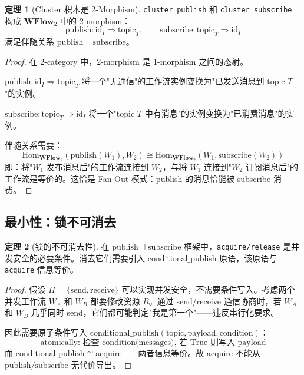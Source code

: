 \documentclass[11pt,a4paper]{article}
\theoremstyle{definition}
\newtheorem{theorem}{定理}[section]
\theoremstyle{definition}
\theoremstyle{remark}
\newcommand{\cat}[1]{\mathbf{#1}}
\newcommand{\catWFlow}{\cat{WFlow}}
\newcommand{\id}{\mathrm{id}}
\newcommand{\homset}[3]{\mathrm{Hom}_{#1}(#2, #3)}
\newcommand{\natarrow}{\Rightarrow}
\newcommand{\adjunction}{\dashv}
\begin{document}
\begin{theorem}[Cluster 积木是 2-Morphism]
\texttt{cluster\_publish} 和 \texttt{cluster\_subscribe} 构成 $\catWFlow_2$ 中的 2-morphism：
\[
\mathrm{publish}: \id_I \natarrow \mathrm{topic}_T, \qquad
\mathrm{subscribe}: \mathrm{topic}_T \natarrow \id_I
\]
满足伴随关系 $\mathrm{publish} \adjunction \mathrm{subscribe}$。
\label{thm:cluster-2morphism}
\end{theorem}

\begin{proof}
在 2-category 中，2-morphism 是 1-morphism 之间的态射。

$\mathrm{publish}: \id_I \natarrow \mathrm{topic}_T$ 将一个"无通信"的工作流实例变换为"已发送消息到 topic $T$"的实例。

$\mathrm{subscribe}: \mathrm{topic}_T \natarrow \id_I$ 将一个"topic $T$ 中有消息"的实例变换为"已消费消息"的实例。

伴随关系需要：
\[
\homset{\catWFlow_2}{\mathrm{publish}(W_1)}{W_2} \cong \homset{\catWFlow_2}{W_1}{\mathrm{subscribe}(W_2)}
\]
即：将"$W_1$ 发布消息后"的工作流连接到 $W_2$，与将 $W_1$ 连接到"$W_2$ 订阅消息后"的工作流是等价的。这恰是 Fan-Out 模式：publish 的消息恰能被 subscribe 消费。
\end{proof}

\subsection{最小性：锁不可消去}

\begin{theorem}[锁的不可消去性]
在 $\mathrm{publish} \adjunction \mathrm{subscribe}$ 框架中，\texttt{acquire/release} 是并发安全的必要条件。消去它们需要引入 $\mathrm{conditional\_publish}$ 原语，该原语与 \texttt{acquire} 信息等价。
\label{thm:lock-irreducible}
\end{theorem}

\begin{proof}
假设 $\Pi = \{\mathrm{send}, \mathrm{receive}\}$ 可以实现并发安全，不需要条件写入。考虑两个并发工作流 $W_A$ 和 $W_B$ 都要修改资源 $R$。通过 send/receive 通信协商时，若 $W_A$ 和 $W_B$ 几乎同时 send，它们都可能判定"我是第一个"——违反串行化要求。

因此需要原子条件写入 $\mathrm{conditional\_publish}(\mathrm{topic}, \mathrm{payload}, \mathrm{condition})$：
\[
\text{atomically: 检查 condition(messages), 若 True 则写入 payload}
\]
而 $\mathrm{conditional\_publish} \cong \mathrm{acquire}$——两者信息等价。故 acquire 不能从 $\mathrm{publish/subscribe}$ 无代价导出。
\end{proof}
\end{document}
